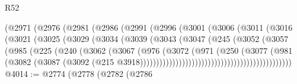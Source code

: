 \begin{lexlean}{R52}
\begin{coremodule}
{{{{{{{{{{{{{{{{{{{{{{{{{{{{{{{{{{{{{{{{{{{{{{{{{{{{{{{{{{{{{{{{{{{{{{{{{{{{{{{{{{{{{{{{{{{{{{{{{{{{{{{{{{{{{{{{{{{{{{{{{{{{{{{{{{{{{{{{{{{{{{{{{{{{{{{{{{{{{{{{{{{{{{{{{{{{{{{{{{{{{{{{{{{{{{{{{{{{{{                            (@2971
                              (@2976
                                (@2981
                                  (@2986
                                    (@2991
                                      (@2996
                                        (@3001
                                          (@3006
                                            (@3011
                                              (@3016
                                                (@3021
                                                  (@3025
                                                    (@3029
                                                      (@3034
                                                        (@3039
                                                          (@3043
                                                            (@3047
                                                              (@245
                                                                (@3052
                                                                  (@3057
                                                                    (@985
                                                                      (@225
                                                                        (@240
                                                                          (@3062
                                                                            (@3067
                                                                              (@976
                                                                                (@3072
                                                                                  (@971
                                                                                    (@250
                                                                                      (@3077
                                                                                        (@981
                                                                                          (@3082
                                                                                            (@3087
                                                                                              (@3092
                                                                                                (@215
                                                                                                  @3918)))))))))))))))))))))))))))))))))))))))))))))))
@4014 := @2774
    (@2778
      (@2782
        (@2786
}}}}}}}}}}}}}}}}}}}}}}}}}}}}}}}}}}}}}}}}}}}}}}}}}}}}}}}}}}}}}}}}}}}}}}}}}}}}}}}}}}}}}}}}}}}}}}}}}}}}}}}}}}}}}}}}}}}}}}}}}}}}}}}}}}}}}}}}}}}}}}}}}}}}}}}}}}}}}}}}}}}}}}}}}}}}}}}}}}}}}}}}}}}}}}}}}}}}}}
\end{coremodule}
\end{lexlean}
